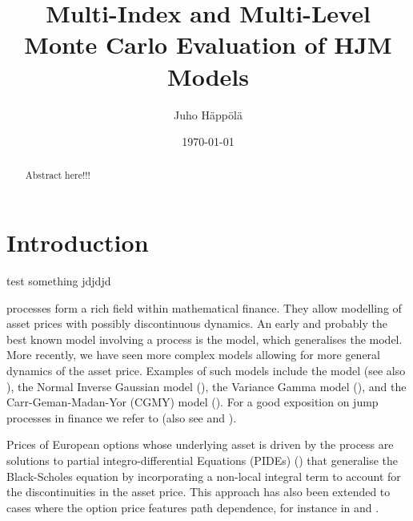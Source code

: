 \documentclass[11pt]{amsart}
\title[MIMC and MLMC HJM]{Multi-Index and Multi-Level Monte Carlo Evaluation of HJM Models}
\author{Juho H\"app\"ol\"a}
\date{\today}
\begin{document}
\begin{abstract}
Abstract here!!!
\end{abstract}

\maketitle


\section{Introduction}
\label{section:Introduction}

test something \cite{haji2015multi} jdjdjd

\levy processes form a rich field within mathematical
finance. They allow modelling of asset prices with possibly discontinuous dynamics. An early and probably the best known model involving
a \levy process is
the \cite{Merton1976125} model, which generalises the \cite{black1973pricing} model. More recently, we have seen more complex models allowing
for more general dynamics of the asset price. Examples of such models include
the \cite{kou2002jump} model (see also \cite{Dotsis20073584}), the Normal Inverse Gaussian
model (\cite{barndorff1997normal, rydberg1997normal}),
the Variance Gamma model (\cite{madan1990variance, madan1998variance}),
and the Carr-Geman-Madan-Yor (CGMY) model
(\cite{cgmy_fine,carr2003stochastic}). For a good exposition on jump processes in finance we refer to \cite{conttankov}
(also see \cite{raible2000levy} and \cite{eberlein2001application}).

Prices of European options whose underlying asset is driven
by the \levy process are solutions to partial integro-differential
Equations (PIDEs) (\cite{nualart2001backward,briani_chioma_natalini,almendral2005numerical,kiessling2011diffusion})
that generalise
the Black-Scholes equation by incorporating a
non-local integral term to account for the discontinuities in
the asset price. This approach has also been extended to
cases where the option price features path dependence,
for instance in \cite{boyarchenko2002barrier} \cite{d2004penalty} and \cite{lord2008fast}.
\end{document}
